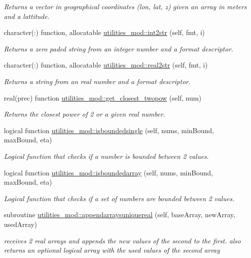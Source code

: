 \begin{DoxyCompactItemize}
\begin{DoxyCompactList}\small\item\em Returns a vector in geographical coordinates (lon, lat, z) given an array in meters and a lattitude. \end{DoxyCompactList}\item 
character(\+:) function, allocatable \mbox{\hyperlink{namespaceutilities__mod_a6ba00b0a503f26c7e755d1efbbe83c5b}{utilities\+\_\+mod\+::int2str}} (self, fmt, i)
\begin{DoxyCompactList}\small\item\em Returns a zero paded string from an integer number and a format descriptor. \end{DoxyCompactList}\item 
character(\+:) function, allocatable \mbox{\hyperlink{namespaceutilities__mod_a2c8481f2b9f4cddf8391bd1e8b624335}{utilities\+\_\+mod\+::real2str}} (self, fmt, i)
\begin{DoxyCompactList}\small\item\em Returns a string from an real number and a format descriptor. \end{DoxyCompactList}\item 
real(prec) function \mbox{\hyperlink{namespaceutilities__mod_a164054d89c012d95f63c12a6cc0ac8d7}{utilities\+\_\+mod\+::get\+\_\+closest\+\_\+twopow}} (self, num)
\begin{DoxyCompactList}\small\item\em Returns the closest power of 2 or a given real number. \end{DoxyCompactList}\item 
logical function \mbox{\hyperlink{namespaceutilities__mod_a258d85bcc477041275bd954667168ea3}{utilities\+\_\+mod\+::isboundedsingle}} (self, nums, min\+Bound, max\+Bound, eta)
\begin{DoxyCompactList}\small\item\em Logical function that checks if a number is bounded between 2 values. \end{DoxyCompactList}\item 
logical function \mbox{\hyperlink{namespaceutilities__mod_a1d16eada2f4cb344ad1500b3edba43fa}{utilities\+\_\+mod\+::isboundedarray}} (self, nums, min\+Bound, max\+Bound, eta)
\begin{DoxyCompactList}\small\item\em Logical function that checks if a set of numbers are bounded between 2 values. \end{DoxyCompactList}\item 
subroutine \mbox{\hyperlink{namespaceutilities__mod_abffd01c3faf22f44e260c42c6f95d5c4}{utilities\+\_\+mod\+::appendarraysuniquereal}} (self, base\+Array, new\+Array, used\+Array)
\begin{DoxyCompactList}\small\item\em receives 2 real arrays and appends the new values of the second to the first. also returns an optional logical array with the used values of the second array \end{DoxyCompactList}\end{DoxyCompactItemize}
